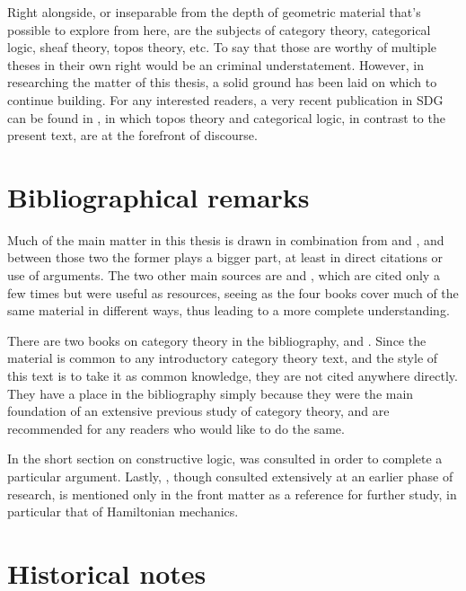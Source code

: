 Right alongside, or inseparable from the depth of geometric material that's possible to explore from here, are the subjects of category theory, categorical logic, sheaf theory, topos theory, etc. To say that those are worthy of multiple theses in their own right would be an criminal understatement. However, in researching the matter of this thesis, a solid ground has been laid on which to continue building. For any interested readers, a very recent publication in SDG can be found in \cite{bun17}, in which topos theory and categorical logic, in contrast to the present text, are at the forefront of discourse.

\section{Bibliographical remarks}

Much of the main matter in this thesis is drawn in combination from \cite{kock06} and \cite{lav96}, and between those two the former plays a bigger part, at least in direct citations or use of arguments. The two other main sources are \cite{bun17} and \cite{kock10}, which are cited only a few times but were useful as resources, seeing as the four books cover much of the same material in different ways, thus leading to a more complete understanding.

There are two books on category theory in the bibliography, \cite{lei16} and \cite{sml71}. Since the material is common to any introductory category theory text, and the style of this text is to take it as common knowledge, they are not cited anywhere directly. They have a place in the bibliography simply because they were the main foundation of an extensive previous study of category theory, and are recommended for any readers who would like to do the same.

In the short section on constructive logic, \cite{fra84} was consulted in order to complete a particular argument. Lastly, \cite{nish96}, though consulted extensively at an earlier phase of research, is mentioned only in the front matter as a reference for further study, in particular that of Hamiltonian mechanics. 

\section{Historical notes}

